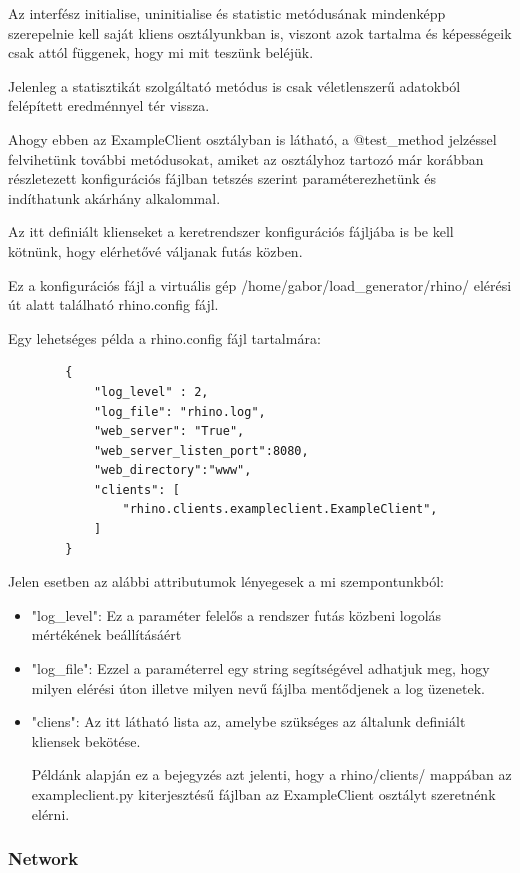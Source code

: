 \documentclass[a4paper,12pt,oneside]{report}
\begin{document}
Az interfész initialise, uninitialise és statistic metódusának mindenképp szerepelnie kell saját kliens osztályunkban is, viszont azok tartalma és képességeik csak attól függenek, hogy mi mit teszünk beléjük.

Jelenleg a statisztikát szolgáltató metódus is csak véletlenszerű adatokból felépített eredménnyel tér vissza.

Ahogy ebben az ExampleClient osztályban is látható, a @test\_method jelzéssel felvihetünk további metódusokat, amiket az osztályhoz tartozó már korábban részletezett konfigurációs fájlban tetszés szerint paraméterezhetünk és indíthatunk akárhány alkalommal.

Az itt definiált klienseket a keretrendszer konfigurációs fájljába is be kell kötnünk, hogy elérhetővé váljanak futás közben.

Ez a konfigurációs fájl a virtuális gép /home/gabor/load\_generator/rhino/ elérési út alatt található rhino.config fájl.

Egy lehetséges példa a rhino.config fájl tartalmára:
\begin{lstlisting}
        {
            "log_level" : 2,
            "log_file": "rhino.log",
            "web_server": "True",
            "web_server_listen_port":8080,
            "web_directory":"www",
            "clients": [
                "rhino.clients.exampleclient.ExampleClient",
            ]
        }
\end{lstlisting}

Jelen esetben az alábbi attributumok lényegesek a mi szempontunkból:
\begin{itemize}
\itemsep0em
	\item "log\_level": Ez a paraméter felelős a rendszer futás közbeni logolás mértékének beállításáért
	\item "log\_file": Ezzel a paraméterrel egy string segítségével adhatjuk meg, hogy milyen elérési úton illetve milyen nevű fájlba mentődjenek a log üzenetek.
	\newpage
	\item "cliens": Az itt látható lista az, amelybe szükséges az általunk definiált kliensek bekötése.
	
	Példánk alapján ez a bejegyzés azt jelenti, hogy a rhino/clients/ mappában az exampleclient.py kiterjesztésű fájlban az ExampleClient osztályt szeretnénk elérni.
\end{itemize}

\subsubsection{Network}
\end{document}
